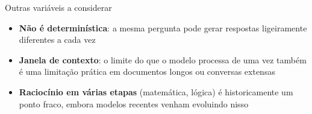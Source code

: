 \documentclass[aspectratio=169,11pt]{beamer}
\begin{document}
\begin{frame}{Outras variáveis a considerar}
  \begin{itemize}
    \item \textbf{Não é determinística}: a mesma pergunta pode gerar respostas ligeiramente diferentes a cada vez
    \item \textbf{Janela de contexto}: o limite do que o modelo processa de uma vez também é uma limitação prática em documentos longos ou conversas extensas
    \item \textbf{Raciocínio em várias etapas} (matemática, lógica) é historicamente um ponto fraco, embora modelos recentes venham evoluindo nisso
  \end{itemize}
\end{frame}

\end{document}
